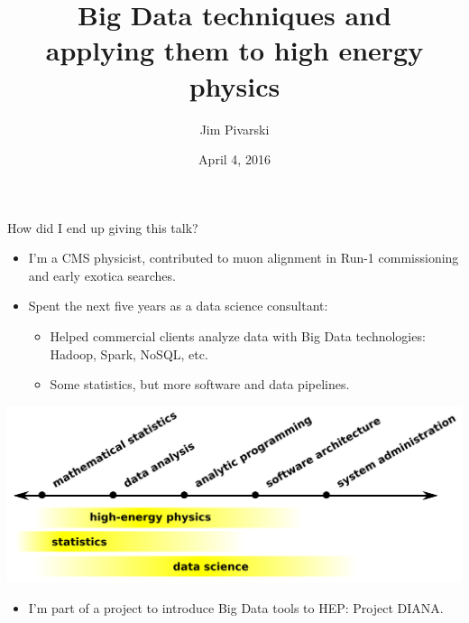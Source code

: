 \documentclass{beamer}
\title[2016-04-04-offline-pr-overview]{Big Data techniques and \\ applying them to high energy physics}
\author{Jim Pivarski}
\institute{Princeton University -- DIANA}
\date{April 4, 2016}
\begin{document}
\begin{frame}
  \titlepage
\end{frame}


\begin{frame}{How did I end up giving this talk?}
\begin{itemize}
\item I'm a CMS physicist, contributed to muon alignment in Run-1 commissioning and early exotica searches.
\item Spent the next five years as a data science consultant:
\begin{itemize}
\item Helped commercial clients analyze data with Big Data technologies: Hadoop, Spark, NoSQL, etc.
\item Some statistics, but more software and data pipelines.
\end{itemize}
\end{itemize}

\includegraphics[width=\linewidth]{spectrum_of_data_science.png}

\begin{itemize}
\item I'm part of a project to introduce Big Data tools to HEP: Project DIANA.
\end{itemize}
\end{frame}
\end{document}
